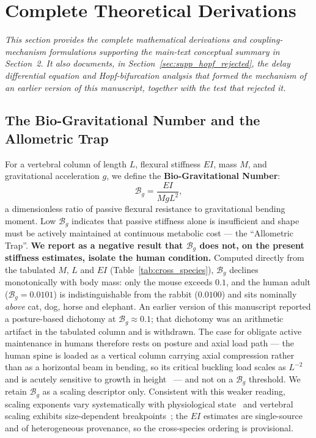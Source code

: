 \section{Complete Theoretical Derivations}
\label{sec:supp_theory}

\textit{This section provides the complete mathematical derivations and coupling-mechanism formulations supporting the main-text conceptual summary in Section~2. It also documents, in Section~\ref{sec:supp_hopf_rejected}, the delay differential equation and Hopf-bifurcation analysis that formed the mechanism of an earlier version of this manuscript, together with the test that rejected it.}

\subsection{The Bio-Gravitational Number and the Allometric Trap}

For a vertebral column of length $L$, flexural stiffness $EI$, mass $M$, and gravitational acceleration $g$, we define the \textbf{Bio-Gravitational Number}:
\begin{equation}
\mathcal{B}_g = \frac{EI}{M g L^2},
\label{eq:bg_number_passive_supp}
\end{equation}
a dimensionless ratio of passive flexural resistance to gravitational bending moment. Low $\mathcal{B}_g$ indicates that passive stiffness alone is insufficient and shape must be actively maintained at continuous metabolic cost --- the ``Allometric Trap''. \textbf{We report as a negative result that $\mathcal{B}_g$ does not, on the present stiffness estimates, isolate the human condition.} Computed directly from the tabulated $M$, $L$ and $EI$ (Table~\ref{tab:cross_species}), $\mathcal{B}_g$ declines monotonically with body mass: only the mouse exceeds $0.1$, and the human adult ($\mathcal{B}_g = 0.0101$) is indistinguishable from the rabbit ($0.0100$) and sits nominally \emph{above} cat, dog, horse and elephant. An earlier version of this manuscript reported a posture-based dichotomy at $\mathcal{B}_g \approx 0.1$; that dichotomy was an arithmetic artifact in the tabulated column and is withdrawn. The case for obligate active maintenance in humans therefore rests on posture and axial load path --- the human spine is loaded as a vertical column carrying axial compression rather than as a horizontal beam in bending, so its critical buckling load scales as $L^{-2}$ and is acutely sensitive to growth in height~\cite{gorman2009idiopathic} --- and not on a $\mathcal{B}_g$ threshold. We retain $\mathcal{B}_g$ as a scaling descriptor only. Consistent with this weaker reading, scaling exponents vary systematically with physiological state~\cite{glazier2022variable} and vertebral scaling exhibits size-dependent breakpoints~\cite{smith2024small}; the $EI$ estimates are single-source and of heterogeneous provenance, so the cross-species ordering is provisional.

